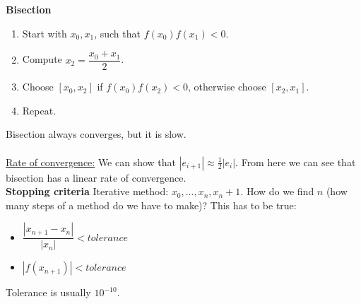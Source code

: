 \documentclass{article}
\begin{document}
\begin{multicols}{3}
\textbf{Bisection}
\begin{enumerate}
  \item Start with $x_0, x_1$, such that $f(x_0)f(x_1) < 0$.
  \item Compute $x_2 = \dfrac{x_0 + x_1}{2}$.
  \item Choose $[x_0, x_2]$ if $f(x_0)f(x_2) < 0$, otherwise choose $[x_2, x_1]$.
  \item Repeat.
\end{enumerate}
Bisection always converges, but it is slow.\\
\\
\underline{Rate of convergence:}
We can show that $|e_{i+1}| \approx \frac{1}{2}|e_i|$. From here we can see that bisection has
a linear rate of convergence.\\

\textbf{Stopping criteria}
Iterative method: $x_0,..., x_n, x_n+1$. How do we find $n$ (how many steps of a method
do we have to make)? This has to be true:
\begin{itemize}
  \item $\dfrac{|x_{n+1} - x_n|}{|x_n|} < tolerance$
  \item $|f(x_{n+1})|<tolerance$
\end{itemize}
Tolerance is usually $10^{-10}$.
\end{multicols}
\end{document}
